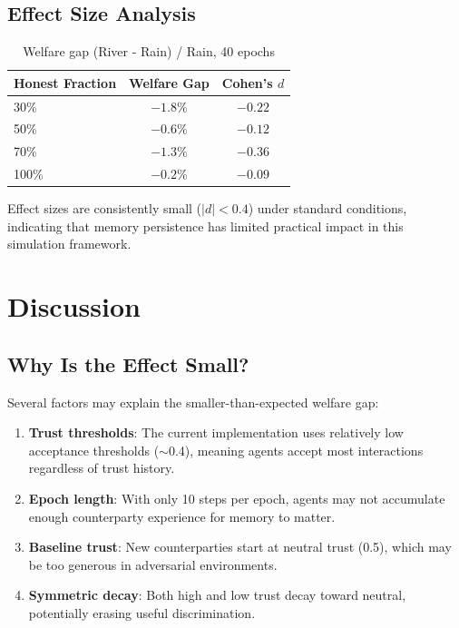 \documentclass{article}
\begin{document}
\subsection{Effect Size Analysis}

\begin{table}[h]
\centering
\begin{tabular}{lcc}
\toprule
Honest Fraction & Welfare Gap & Cohen's $d$ \\
\midrule
30\% & $-1.8\%$ & $-0.22$ \\
50\% & $-0.6\%$ & $-0.12$ \\
70\% & $-1.3\%$ & $-0.36$ \\
100\% & $-0.2\%$ & $-0.09$ \\
\bottomrule
\end{tabular}
\caption{Welfare gap (River - Rain) / Rain, 40 epochs}
\end{table}

Effect sizes are consistently small ($|d| < 0.4$) under standard conditions, indicating that memory persistence has limited practical impact in this simulation framework.

\section{Discussion}

\subsection{Why Is the Effect Small?}

Several factors may explain the smaller-than-expected welfare gap:

\begin{enumerate}
\item \textbf{Trust thresholds}: The current implementation uses relatively low acceptance thresholds ($\sim$0.4), meaning agents accept most interactions regardless of trust history.

\item \textbf{Epoch length}: With only 10 steps per epoch, agents may not accumulate enough counterparty experience for memory to matter.

\item \textbf{Baseline trust}: New counterparties start at neutral trust (0.5), which may be too generous in adversarial environments.

\item \textbf{Symmetric decay}: Both high and low trust decay toward neutral, potentially erasing useful discrimination.
\end{enumerate}
\end{document}
